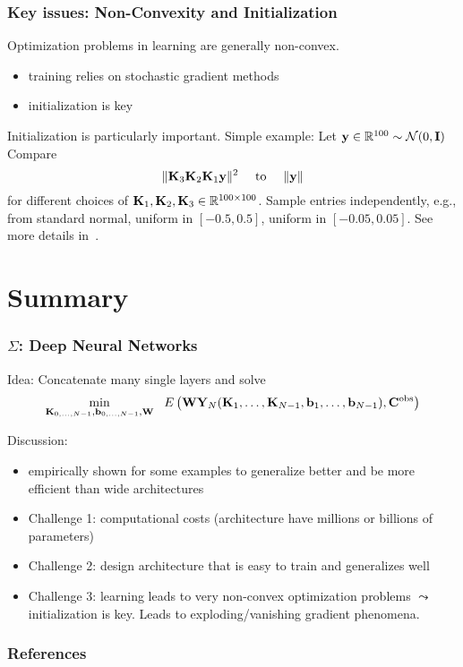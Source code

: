 \documentclass[12pt,fleqn]{beamer}
\begin{document}
\begin{frame}
	\frametitle{Key issues: Non-Convexity and Initialization}
	
	Optimization problems in learning are generally non-convex.
	
	\begin{itemize}
		\item training relies on stochastic gradient methods~\cite{bottou2016optimization}
		\item initialization is key~\cite{GlorotBengio2010}
	\end{itemize}
	

	\bigskip
	
	Initialization is particularly important.  Simple example:
	Let ${\bf y}\in\mathbb{R}^{100} \sim \mathcal{N}(0,{\bf I})$	Compare
	\begin{equation*}
		\|{\bf K}_3 {\bf K}_2 {\bf K}_1 {\bf y} \|^2 \quad \text{ to } \quad\|{\bf y} \|
	\end{equation*}
	for different choices of ${\bf K}_1,{\bf K}_2,{\bf K}_3 \in \mathbb{R}^{100\times 100}$. Sample entries independently, e.g., from standard normal,  uniform in $[-0.5,0.5]$, uniform in $[-0.05,0.05]$. 	See more details in~\cite{GlorotBengio2010}. 
	
\end{frame}


\section{Summary} %
\label{sec:numerical_optimization}
\begin{frame}[fragile]\frametitle{$\Sigma$: Deep Neural Networks}

Idea: Concatenate many single layers and solve
$$ 
\min_{{\bf K}_{0,\ldots,N-1},{\bf b}_{0,\ldots,N-1},{\bf W}} \ \ E\left({\bf W} {\bf Y}_N({\bf K}_1,\ldots,{\bf K}_{N-1},{\bf b}_1,\ldots, {\bf b}_{N-1}) , {\bf C}^{\rm obs} \right)
 $$


Discussion:
\begin{itemize}
	\item empirically shown for some examples to generalize better and be more efficient than wide architectures 
	\item 
Challenge 1: computational costs (architecture have millions or billions of parameters)
	\item Challenge 2: design architecture that is easy to train and generalizes well
	\item Challenge 3: learning leads to very non-convex optimization problems $\leadsto$ initialization is key. Leads to exploding/vanishing gradient phenomena.
\end{itemize}
\end{frame}



\begin{frame}[allowframebreaks]
	\frametitle{References}



\end{frame}
\end{document}
